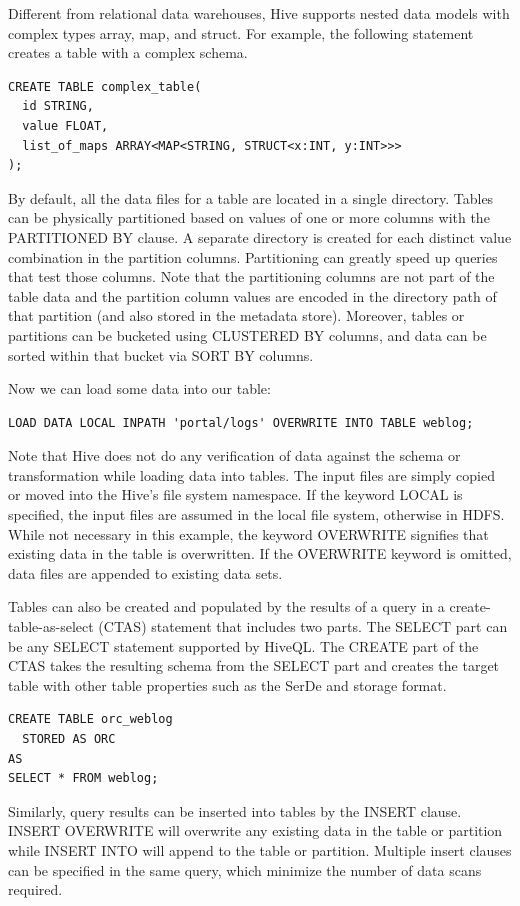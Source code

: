 \documentclass[11pt]{book}
\begin{document}
Different from relational data warehouses, Hive supports nested data models with complex types array, map, and struct. For example, the following statement creates a table with a complex schema.

\begin{lstlisting}
CREATE TABLE complex_table(
  id STRING,
  value FLOAT,
  list_of_maps ARRAY<MAP<STRING, STRUCT<x:INT, y:INT>>>
);
\end{lstlisting}
By default, all the data files for a table are located in a single directory. Tables can be physically partitioned based on values of one or more columns with the PARTITIONED BY clause. A separate directory is created for each distinct value combination in the partition columns. Partitioning can greatly speed up queries that test those columns. Note that the partitioning columns are not part of the table data and the partition column values are encoded in the directory path of that partition (and also stored in the metadata store). Moreover, tables or partitions can be bucketed using CLUSTERED BY columns, and data can be sorted within that bucket via SORT BY columns.

Now we can load some data into our table:

\begin{lstlisting}
LOAD DATA LOCAL INPATH 'portal/logs' OVERWRITE INTO TABLE weblog;
\end{lstlisting}
Note that Hive does not do any verification of data against the schema or transformation while loading data into tables. The input files are simply copied or moved into the Hive's file system namespace. If the keyword LOCAL is specified, the input files are assumed in the local file system, otherwise in HDFS. While not necessary in this example, the keyword OVERWRITE signifies that existing data in the table is overwritten. If the OVERWRITE keyword is omitted, data files are appended to existing data sets.

Tables can also be created and populated by the results of a query in a create-table-as-select (CTAS) statement that includes two parts. The SELECT part can be any SELECT statement supported by HiveQL. The CREATE part of the CTAS takes the resulting schema from the SELECT part and creates the target table with other table properties such as the SerDe and storage format.

\begin{lstlisting}
CREATE TABLE orc_weblog
  STORED AS ORC
AS
SELECT * FROM weblog;
\end{lstlisting}
Similarly, query results can be inserted into tables by the INSERT clause. INSERT OVERWRITE will overwrite any existing data in the table or partition while INSERT INTO will append to the table or partition. Multiple insert clauses can be specified in the same query, which minimize the number of data scans required.
\end{document}
